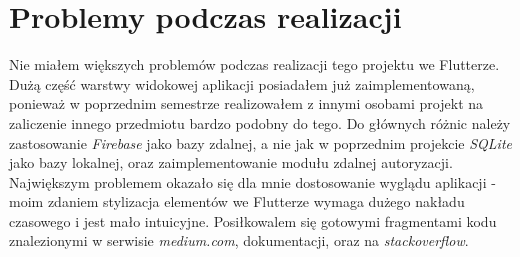 \documentclass[12pt,a4paper]{article}
\begin{document}
	\section{Problemy podczas realizacji}
Nie miałem większych problemów podczas realizacji tego projektu we Flutterze. Dużą część warstwy widokowej aplikacji posiadałem już zaimplementowaną, ponieważ w poprzednim semestrze realizowałem z innymi osobami projekt na zaliczenie innego przedmiotu bardzo podobny do tego. Do głównych różnic należy zastosowanie \textit{Firebase} jako bazy zdalnej, a nie jak w poprzednim projekcie \textit{SQLite} jako bazy lokalnej, oraz zaimplementowanie modułu zdalnej autoryzacji. Największym problemem okazało się dla mnie dostosowanie wyglądu aplikacji - moim zdaniem stylizacja elementów we Flutterze wymaga dużego nakładu czasowego i jest mało intuicyjne. Posiłkowalem się gotowymi fragmentami kodu znalezionymi w serwisie \textit{medium.com}, dokumentacji, oraz na \textit{stackoverflow}.
    
\end{document}
